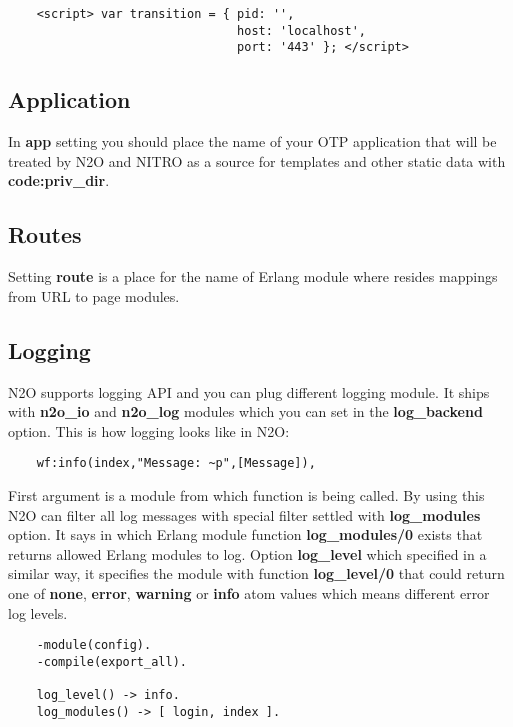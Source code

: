 \vspace{1\baselineskip}
\begin{lstlisting}
    <script> var transition = { pid: '',
                                host: 'localhost',
                                port: '443' }; </script>
\end{lstlisting}
\vspace{1\baselineskip}

\newpage

\subsection*{Application}
In {\bf app} setting you should place the name of your OTP application
that will be treated by N2O and NITRO as a source for templates and
other static data with {\bf code:priv\_dir}.

\subsection*{Routes}
Setting {\bf route} is a place for the name of Erlang module where
resides mappings from URL to page modules.

\subsection*{Logging}
N2O supports logging API and you can plug different logging module.
It ships with {\bf n2o\_io} and {\bf n2o\_log} modules which you can set in the
{\bf log\_backend} option. This is how logging looks like in N2O:

\vspace{1\baselineskip}
\begin{lstlisting}
    wf:info(index,"Message: ~p",[Message]),
\end{lstlisting}
\vspace{1\baselineskip}

First argument is a module from which function is being called. By using this
N2O can filter all log messages with special filter settled with {\bf log\_modules} option.
It says in which Erlang module function {\bf log\_modules/0} exists that
returns allowed Erlang modules to log. Option {\bf log\_level} which specified
in a similar way, it specifies the module with function {\bf log\_level/0} that could
return one of {\bf none}, {\bf error}, {\bf warning} or {\bf info} atom values which
means different error log levels.

\vspace{1\baselineskip}
\begin{lstlisting}
    -module(config).
    -compile(export_all).

    log_level() -> info.
    log_modules() -> [ login, index ].
\end{lstlisting}
\vspace{1\baselineskip}


